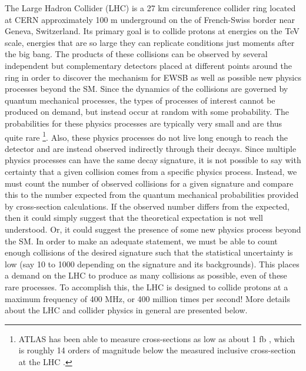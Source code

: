 



The Large Hadron Collider (LHC) \cite{lhc} is
a 27 km circumference collider ring
located at CERN approximately 100 m underground on the 
of French-Swiss border near Geneva, Switzerland.
Its primary goal is to collide protons at energies on the TeV scale, 
energies that are so large they can replicate conditions just moments
after the big bang.
The products of these collisions can 
be observed
by several independent but complementary detectors placed at different
points around the ring in order to discover the mechanism
for EWSB as well as possible new physics processes beyond the SM.
Since the dynamics of the collisions are governed by quantum mechanical
processes, the types of processes of interest cannot be
produced on demand, but instead occur at random with some
probability.
The probabilities for these physics processes are 
typically very small and are thus quite
rare \footnote{ATLAS has been able to measure cross-sections as 
low as about 1 fb \cite{PhysRevLett.113.141803}, which is roughly
14 orders of magnitude below the measured inclusive cross-section
at the LHC \cite{Aad:2014dca}.}.
Also, these physics processes do not live long
enough to reach the detector and are instead observed indirectly through their
decays. Since multiple physics processes can have the same decay 
signature, it is not possible to say with certainty that a given 
collision comes from a specific physics process. Instead, 
we must count the number of observed collisions for a given signature
and compare this to the number expected from the 
quantum mechanical probabilities provided by cross-section
calculations.  If the observed number differs
from the expected, then it could simply suggest that the theoretical expectation
is not well understood.  Or, it could suggest the presence of some new physics
process beyond the SM.
In order to make an adequate statement, we must be able to count
enough collisions of the desired signature 
such that the statistical uncertainty is low
(say 10 to 1000 depending on the signature and its backgrounds).  
This places a demand
on the LHC to produce as many collisions as possible, even of these rare
processes. To accomplish this, the LHC is designed to collide
protons at a maximum frequency of 400 MHz, or 400 million times per second!
More details about the LHC and collider physics in general are presented
below.



